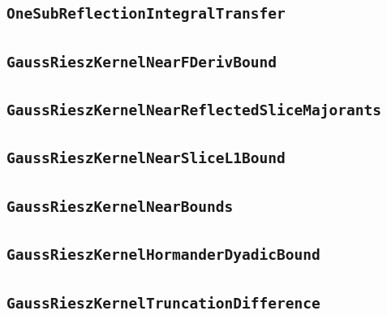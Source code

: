 \documentclass[11pt]{amsart}
\theoremstyle{definition}
\begin{document}
\subsection{\texorpdfstring{\texttt{OneSubReflectionIntegralTransfer}}{OneSubReflectionIntegralTransfer}}\label{node:OneSubReflectionIntegralTransfer}


\subsection{\texorpdfstring{\texttt{GaussRieszKernelNearFDerivBound}}{GaussRieszKernelNearFDerivBound}}\label{node:GaussRieszKernelNearFDerivBound}


\subsection{\texorpdfstring{\texttt{GaussRieszKernelNearReflectedSliceMajorants}}{GaussRieszKernelNearReflectedSliceMajorants}}\label{node:GaussRieszKernelNearReflectedSliceMajorants}


\subsection{\texorpdfstring{\texttt{GaussRieszKernelNearSliceL1Bound}}{GaussRieszKernelNearSliceL1Bound}}\label{node:GaussRieszKernelNearSliceL1Bound}


\subsection{\texorpdfstring{\texttt{GaussRieszKernelNearBounds}}{GaussRieszKernelNearBounds}}\label{node:GaussRieszKernelNearBounds}


\subsection{\texorpdfstring{\texttt{GaussRieszKernelHormanderDyadicBound}}{GaussRieszKernelHormanderDyadicBound}}\label{node:GaussRieszKernelHormanderDyadicBound}


\subsection{\texorpdfstring{\texttt{GaussRieszKernelTruncationDifference}}{GaussRieszKernelTruncationDifference}}\label{node:GaussRieszKernelTruncationDifference}

\end{document}
